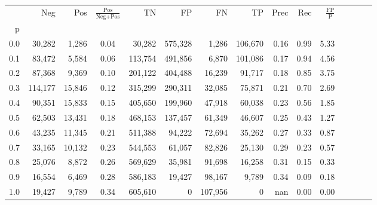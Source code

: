 \begin{tabular}{rrrcrrrrrrrrrrr}
\toprule
{} &      Neg &     Pos & $\frac{\text{Pos}}{\text{Neg}+\text{Pos}}$ &       TN &       FP &       FN &       TP &  Prec &   Rec & $\frac{\text{FP}}{\text{P}}$ \\
p   &          &         &                                            &          &          &          &          &       &       &                              \\
\midrule
0.0 &   30,282 &   1,286 &                                       0.04 &   30,282 &  575,328 &    1,286 &  106,670 &  0.16 &  0.99 &                         5.33 \\
0.1 &   83,472 &   5,584 &                                       0.06 &  113,754 &  491,856 &    6,870 &  101,086 &  0.17 &  0.94 &                         4.56 \\
0.2 &   87,368 &   9,369 &                                       0.10 &  201,122 &  404,488 &   16,239 &   91,717 &  0.18 &  0.85 &                         3.75 \\
0.3 &  114,177 &  15,846 &                                       0.12 &  315,299 &  290,311 &   32,085 &   75,871 &  0.21 &  0.70 &                         2.69 \\
0.4 &   90,351 &  15,833 &                                       0.15 &  405,650 &  199,960 &   47,918 &   60,038 &  0.23 &  0.56 &                         1.85 \\
0.5 &   62,503 &  13,431 &                                       0.18 &  468,153 &  137,457 &   61,349 &   46,607 &  0.25 &  0.43 &                         1.27 \\
0.6 &   43,235 &  11,345 &                                       0.21 &  511,388 &   94,222 &   72,694 &   35,262 &  0.27 &  0.33 &                         0.87 \\
0.7 &   33,165 &  10,132 &                                       0.23 &  544,553 &   61,057 &   82,826 &   25,130 &  0.29 &  0.23 &                         0.57 \\
0.8 &   25,076 &   8,872 &                                       0.26 &  569,629 &   35,981 &   91,698 &   16,258 &  0.31 &  0.15 &                         0.33 \\
0.9 &   16,554 &   6,469 &                                       0.28 &  586,183 &   19,427 &   98,167 &    9,789 &  0.34 &  0.09 &                         0.18 \\
1.0 &   19,427 &   9,789 &                                       0.34 &  605,610 &        0 &  107,956 &        0 &   nan &  0.00 &                         0.00 \\
\bottomrule
\end{tabular}
